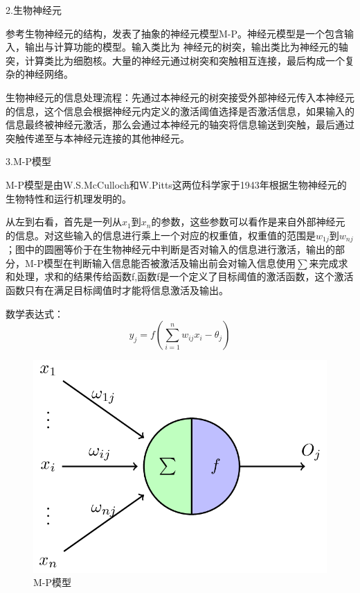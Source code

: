 \documentclass[openbib]{article}
\begin{document}
	\begin{center}
		2.生物神经元
	\end{center}
	
	参考生物神经元的结构，发表了抽象的神经元模型M-P。神经元模型是一个包含输入，输出与计算功能的模型。输入类比为 神经元的树突，输出类比为神经元的轴突，计算类比为细胞核。大量的神经元通过树突和突触相互连接，最后构成一个复杂的神经网络。
	
	生物神经元的信息处理流程：先通过本神经元的树突接受外部神经元传入本神经元的信息，这个信息会根据神经元内定义的激活阈值选择是否激活信息，如果输入的信息最终被神经元激活，那么会通过本神经元的轴突将信息输送到突触，最后通过突触传递至与本神经元连接的其他神经元。
	
	\begin{center}
		3.M-P模型
	\end{center}
	
	M-P模型是由W.S.McCulloch和W.Pitts这两位科学家于1943年根据生物神经元的生物特性和运行机理发明的。
	
	从左到右看，首先是一列从$x_1$到$x_n$的参数，这些参数可以看作是来自外部神经元的信息。对这些输入的信息进行乘上一个对应的权重值，权重值的范围是$w_{1j}$到$w_{nj}$；图中的圆圈等价于在生物神经元中判断是否对输入的信息进行激活，输出的部分，M-P模型在判断输入信息能否被激活及输出前会对输入信息使用$\sum$来完成求和处理，求和的结果传给函数f,函数f是一个定义了目标阈值的激活函数，这个激活函数只有在满足目标阈值时才能将信息激活及输出。
	
	数学表达式：$$y_j=f(\sum_{i=1}^{n}w_{ij}x_i-\theta_j)$$

	\begin{figure}[htbp]
		\centering
		\includegraphics[scale=0.4]{M-P模型}
		\caption{M-P模型}
	\end{figure}
\end{document}
